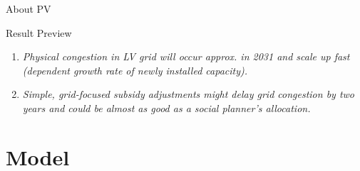 \documentclass[10pt, aspectratio=169]{beamer}
\begin{document}
\begin{frame}{About PV}
\vspace{0.01cm}
  \begin{block}{Result Preview}
    \begin{enumerate}
      \item 
      \textit{Physical congestion in LV grid will occur approx. in 2031 and scale up fast (dependent growth rate of newly installed capacity).}
      \vspace{0.1cm}
      \item 
      \textit{Simple, grid-focused subsidy adjustments might delay grid congestion by two years and could be almost as good as a social planner's allocation.}
    \end{enumerate}
  \end{block}
\end{frame}


\section{Model}
\end{document}
